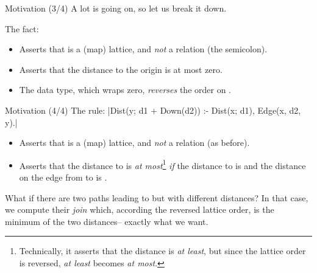 \begin{frame}[fragile]{Motivation (3/4)}
A lot is going on, so let us break it down.

\medskip

The fact: 

\begin{itemize}
    \pause \item Asserts that  is a (map) lattice, and \emph{not} a relation (the semicolon).
    \pause \item Asserts that the distance to the origin is at most zero. 
    \pause \item The  data type, which wraps zero, \emph{reverses} the order
    on .
\end{itemize}
\end{frame}

\begin{frame}[fragile]{Motivation (4/4)}
The rule: \Code|Dist(y; d1 + Down(d2)) :- Dist(x; d1), Edge(x, d2, y).|
%
\begin{itemize}
    \pause \item Asserts that  is a (map) lattice, and \emph{not} a relation (as before).
    \pause \item Asserts that the distance to  is \emph{at
    most}\footnote{Technically, it asserts that the distance is \emph{at least},
    but since the lattice order is reversed, \emph{at least} becomes \emph{at
    most}.}  \emph{if} the distance to  is 
    and the distance on the edge from  to  is .
\end{itemize}

\pause 

What if there are two paths leading to  but with different distances?
In that case, we compute their \emph{join} which, according the reversed lattice
order, is the minimum of the two distances-- exactly what we want.
\end{frame}

